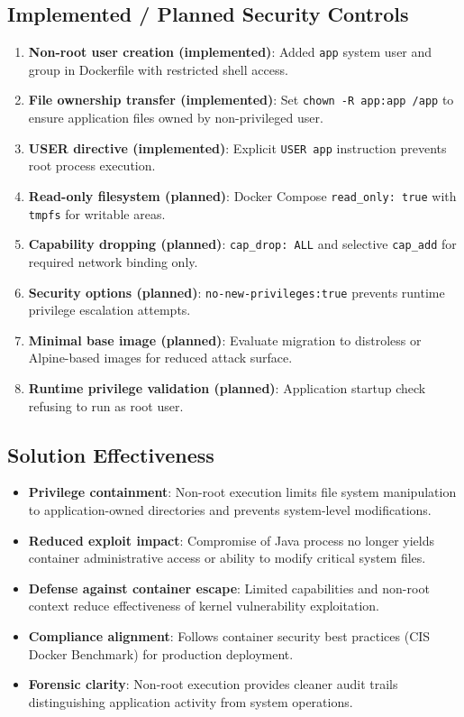 \documentclass[]{UCD_CS_FYP_Report}
\begin{document}
\subsection*{Implemented / Planned Security Controls}
\begin{enumerate}
  \item \textbf{Non-root user creation (implemented)}: Added \texttt{app} system user and group in Dockerfile with restricted shell access.
  \item \textbf{File ownership transfer (implemented)}: Set \texttt{chown -R app:app /app} to ensure application files owned by non-privileged user.
  \item \textbf{USER directive (implemented)}: Explicit \texttt{USER app} instruction prevents root process execution.
  \item \textbf{Read-only filesystem (planned)}: Docker Compose \texttt{read\_only: true} with \texttt{tmpfs} for writable areas.
  \item \textbf{Capability dropping (planned)}: \texttt{cap\_drop: ALL} and selective \texttt{cap\_add} for required network binding only.
  \item \textbf{Security options (planned)}: \texttt{no-new-privileges:true} prevents runtime privilege escalation attempts.
  \item \textbf{Minimal base image (planned)}: Evaluate migration to distroless or Alpine-based images for reduced attack surface.
  \item \textbf{Runtime privilege validation (planned)}: Application startup check refusing to run as root user.
\end{enumerate}

\subsection*{Solution Effectiveness}
\begin{itemize}
  \item \textbf{Privilege containment}: Non-root execution limits file system manipulation to application-owned directories and prevents system-level modifications.
  \item \textbf{Reduced exploit impact}: Compromise of Java process no longer yields container administrative access or ability to modify critical system files.
  \item \textbf{Defense against container escape}: Limited capabilities and non-root context reduce effectiveness of kernel vulnerability exploitation.
  \item \textbf{Compliance alignment}: Follows container security best practices (CIS Docker Benchmark) for production deployment.
  \item \textbf{Forensic clarity}: Non-root execution provides cleaner audit trails distinguishing application activity from system operations.
\end{itemize}
\end{document}
